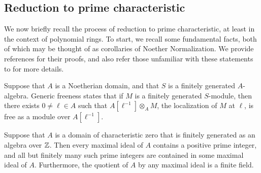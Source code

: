 \documentclass{amsart}
\begin{document}
 
\subsection{Reduction to prime characteristic}

We now briefly recall the process of reduction to prime characteristic, at least in the context of polynomial rings.  To start, we recall some fundamental facts, both of which may be thought of as corollaries of Noether Normalization.  We provide references for their proofs, and also refer those unfamiliar with these statements to \cite[Chapter 3]{hernandez.thesis} for more details.

\begin{remark} \label{generic-freeness}
   Suppose that $A$ is a Noetherian domain,  and that $S$ is a finitely generated $A$-algebra.
   Generic freeness states that if $M$ is a finitely generated $S$-module, then there exists  $0 \neq \ell \in A$ such that $A[\ell^{-1}] \otimes_A M$, the localization of $M$ at $\ell$, is free as a module over $A[\ell^{-1}]$.
\end{remark}

\begin{remark}
   \label{maximal ideals: R}
   Suppose that $A$ is a domain of characteristic zero that is finitely generated as an algebra over $\mathbb{Z}$.
   Then every maximal ideal of $A$ contains a positive prime integer, and all but finitely many such prime integers are contained in some maximal ideal of $A$.
   Furthermore, the quotient of $A$ by any maximal ideal is a finite field.
\end{remark}
\end{document}
